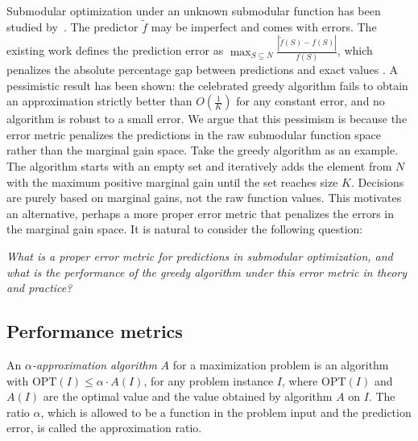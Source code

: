 Submodular optimization under an unknown submodular function has been studied by~\cite{submodularOptNoisetoImageCollection,submodularOptNoise,horel2016maximization}. The predictor $\tilde{f}$ may be imperfect and comes with errors. The existing work defines the prediction error as $\max_{S \subseteq N}{\frac{|\tilde{f}(S) - f(S)|}{f(S)}}$, which penalizes the absolute percentage gap between predictions and exact values \cite{submodularOptNoise}. A pessimistic result has been shown: the celebrated greedy algorithm \cite{greedySubmodularFunctions} fails to obtain an approximation strictly better than $O(\frac{1}{K})$ for any constant error, and no algorithm is robust to a small error. We argue that this pessimism is because the error metric penalizes the predictions in the raw submodular function space rather than the marginal gain space. Take the greedy algorithm as an example. The algorithm starts with an empty set and iteratively adds the element from $N$ with the maximum positive marginal gain until the set reaches size $K$. Decisions are purely based on marginal gains, not the raw function values. This motivates an alternative, perhaps a more proper error metric that penalizes the errors in the marginal gain space. It is natural to consider the following question:
\begin{center}
\textit{What is a proper error metric for predictions in submodular optimization, and what is the performance of the greedy algorithm under this error metric in theory and practice?}
\end{center}


\subsection{Performance metrics}

An \textit{$\alpha$-approximation algorithm} $A$ for a maximization problem is an algorithm with $\text{OPT}(I) \leq \alpha \cdot A (I)$, for any problem instance $I$, where $\text{OPT}(I)$ and $A(I)$ are the optimal value and the value obtained by algorithm $A$ on $I$. The ratio $\alpha$, which is allowed to be a function in the problem input and the prediction error, is called the approximation ratio. %

